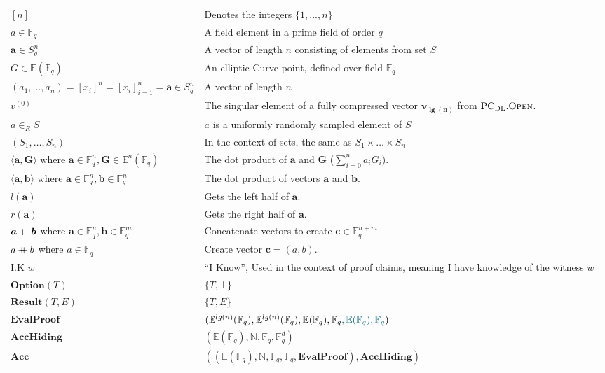 \documentclass[
]{article}
\newcommand*\Fb{\mathbb{F}}
\newcommand*\Nb{\mathbb{N}}
\newcommand*\Eb{\mathbb{E}}
\newcommand*\cat{\mathbin{+\mkern-10mu+}}
\newcommand{\mathblue}[1]{\mathcolor{GbBlueDk}{#1}}
\renewcommand{\vec}[1]{ \boldsymbol{#1} }
\newcommand{\dotp}[2]{ \langle #1, #2 \rangle }
\newcommand*{\PCDL}{\text{PC}_{\text{DL}}}
\newcommand*{\PCDLOpen}{\PCDL.\mathrm{\text{O\scriptsize PEN}}}
\newcommand*\Result{\mathbf{Result}}
\newcommand*\Option{\mathbf{Option}}
\newcommand*\Acc{\mathbf{Acc}}
\newcommand*\AccHiding{\mathbf{AccHiding}}
\newcommand*\EvalProof{\mathbf{EvalProof}}
\begin{document}
\begin{longtable}[]{@{}
  >{\raggedright\arraybackslash}p{}
  >{\raggedright\arraybackslash}p{}@{}}
\toprule\noalign{}
\endhead
\bottomrule\noalign{}
\endlastfoot
\([n]\) & Denotes the integers \(\{ 1, ..., n \}\) \\
\(a \in \Fb_q\) & A field element in a prime field of order \(q\) \\
\(\vec{a} \in S^n_q\) & A vector of length \(n\) consisting of elements
from set \(S\) \\
\(G \in \Eb(\Fb_q)\) & An elliptic Curve point, defined over field
\(\Fb_q\) \\
\((a_1, \dots, a_n) = [x_i]^n = [x_i]_{i=1}^n = \vec{a} \in S^n_q\) & A
vector of length \(n\) \\
\(v^{(0)}\) & The singular element of a fully compressed vector
\(\vec{v_{\lg(n)}}\) from \(\PCDLOpen\). \\
\(a \in_R S\) & \(a\) is a uniformly randomly sampled element of
\(S\) \\
\((S_1, \dots, S_n)\) & In the context of sets, the same as
\(S_1 \times \dots \times S_n\) \\
\(\dotp{\vec{a}}{\vec{G}}\) where
\(\vec{a} \in \Fb^n_q, \vec{G} \in \Eb^n(\Fb_q)\) & The dot product of
\(\vec{a}\) and \(\vec{G}\) (\(\sum^n_{i=0} a_i G_i\)). \\
\(\dotp{\vec{a}}{\vec{b}}\) where
\(\vec{a} \in \Fb^n_q, \vec{b} \in \Fb^n_q\) & The dot product of
vectors \(\vec{a}\) and \(\vec{b}\). \\
\(l(\vec{a})\) & Gets the left half of \(\vec{a}\). \\
\(r(\vec{a})\) & Gets the right half of \(\vec{a}\). \\
\(\vec{a} \cat \vec{b}\) where
\(\vec{a} \in \Fb^n_q, \vec{b} \in \Fb^m_q\) & Concatenate vectors to
create \(\vec{c} \in \Fb^{n+m}_q\). \\
\(a \cat b\) where \(a \in \Fb_q\) & Create vector
\(\vec{c} = (a, b)\). \\
I.K \(w\) & ``I Know'', Used in the context of proof claims, meaning I
have knowledge of the witness \(w\) \\
\(\Option(T)\) & \(\{ T, \bot \}\) \\
\(\Result(T, E)\) & \(\{ T, E \}\) \\
\(\EvalProof\) &
\((\Eb^{lg(n)}(\Fb_q), \Eb^{lg(n)}(\Fb_q), \Eb(\Fb_q), \Fb_q\mathblue{, \Eb(\Fb_q), \Fb_q})\) \\
\(\AccHiding\) & \((\Eb(\Fb_q), \Nb, \Fb_q, \Fb^d_q)\) \\
\(\Acc\) &
\(((\Eb(\Fb_q), \Nb, \Fb_q, \Fb_q, \EvalProof), \AccHiding)\) \\
\end{longtable}
\end{document}
